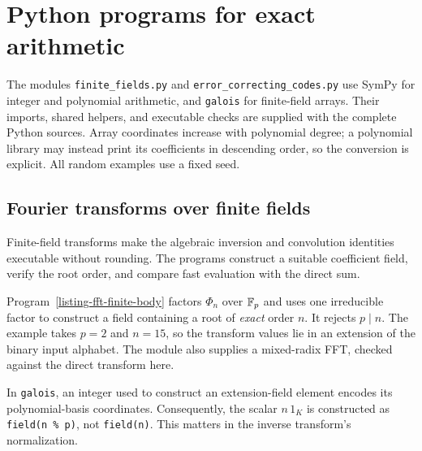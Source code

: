 \chapter{Python programs for exact arithmetic}
\label{appendix-software-resources}

The modules \texttt{finite\_fields.py} and
\texttt{error\_correcting\_codes.py} use SymPy for integer and polynomial
arithmetic, and \texttt{galois} for finite-field arrays. Their imports,
shared helpers, and executable checks are supplied with the complete Python
sources. Array coordinates increase with polynomial degree; a polynomial
library may instead print its coefficients in descending order, so the
conversion is explicit. All random examples use a fixed seed.

\section{Fourier transforms over finite fields}
\label{sect1-listing-transform-finite-body}

Finite-field transforms make the algebraic inversion and convolution
identities executable without rounding. The programs construct a suitable
coefficient field, verify the root order, and compare fast evaluation with
the direct sum.

Program~\ref{listing-fft-finite-body} factors $\Phi_n$ over $\mathbb{F}_p$ and
uses one irreducible factor to construct a field containing a root of
\emph{exact} order $n$. It rejects $p\mid n$. The example takes $p=2$
and $n=15$, so the transform values lie in an extension of the binary
input alphabet. The module also supplies a mixed-radix FFT, checked against
the direct transform here.

In \texttt{galois}, an integer used to construct an extension-field element
encodes its polynomial-basis coordinates. Consequently, the scalar $n\,1_K$
is constructed as \texttt{field(n \% p)}, not \texttt{field(n)}. This
matters in the inverse transform's normalization.
\begin{listing}[H]
\caption{Constructing and checking an exact finite-field Fourier transform.}
\label{listing-fft-finite-body}
\end{listing}

